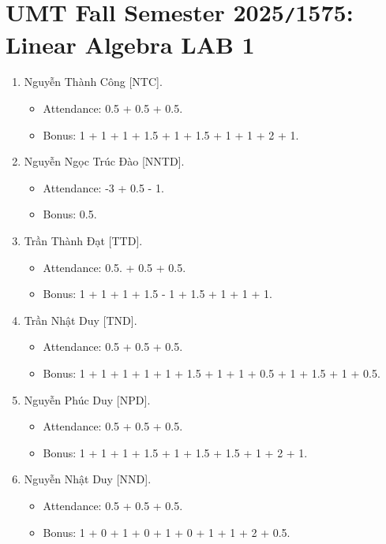 \documentclass{article}
\begin{document}

\section{UMT Fall Semester 2025{\tt/}1575: Linear Algebra LAB 1}

\begin{enumerate}
    \item {\sc Nguyễn Thành Công [NTC].}
    \begin{itemize}
        \item Attendance: 0.5 + 0.5 + 0.5.
        \item Bonus: 1 + 1 + 1 + 1.5 + 1 + 1.5 + 1 + 1 + 2 + 1.
    \end{itemize}
    \item {\sc Nguyễn Ngọc Trúc Đào [NNTD].}
    \begin{itemize}
        \item Attendance: -3 + 0.5 - 1.
        \item Bonus: 0.5.
    \end{itemize}
    \item {\sc Trần Thành Đạt [TTD].}
    \begin{itemize}
        \item Attendance: 0.5. + 0.5 + 0.5.
        \item Bonus: 1 + 1 + 1 + 1.5 - 1 + 1.5 + 1 + 1 + 1.
    \end{itemize}
    \item {\sc Trần Nhật Duy [TND].}
    \begin{itemize}
        \item Attendance: 0.5 + 0.5 + 0.5.
        \item Bonus: 1 + 1 + 1 + 1 + 1 + 1.5 + 1 + 1 + 0.5 + 1 + 1.5 + 1 + 0.5.
    \end{itemize}
    \item {\sc Nguyễn Phúc Duy [NPD].}
    \begin{itemize}
        \item Attendance: 0.5 + 0.5 + 0.5.
        \item Bonus: 1 + 1 + 1 + 1.5 + 1 + 1.5 + 1.5 + 1 + 2 + 1.
    \end{itemize}
    \item {\sc Nguyễn Nhật Duy [NND].}
    \begin{itemize}
        \item Attendance: 0.5 + 0.5 + 0.5.
        \item Bonus: 1 + 0 + 1 + 0 + 1 + 0 + 1 + 1 + 2 + 0.5.

\end{itemize}
\end{enumerate}
\end{document}
